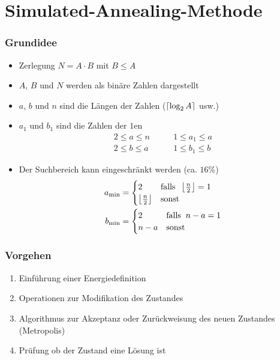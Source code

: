 \section{Simulated-Annealing-Methode}

\begin{frame}
  \frametitle{Grundidee}
  \begin{itemize}
    \item Zerlegung $N=A\cdot B$ mit $B \leq A$
    \pause{}
    \item $A$, $B$ und $N$ werden als binäre Zahlen dargestellt
    \pause{}
    \item $a$, $b$ und $n$ sind die Längen der Zahlen ($\left\lceil\log_2 A\right\rceil$ usw.)
    \pause{}
    \item $a_1$ und $b_1$ sind die Zahlen der $1$en
      \begin{align*}
        2 \leq a \leq n \quad&\quad 1 \leq a_1 \leq a \\
        2 \leq b \leq a \quad&\quad	1 \leq b_1 \leq b
      \end{align*}
    \pause{}
    \item Der Suchbereich kann eingeschränkt werden (ca. $16\%$)
      \begin{align*}
        a_{\min}&=\begin{cases} 2 & \mathrm{falls}\;\; \left\lfloor\frac{n}{2}\right\rfloor=1 \\ \left\lfloor\frac{n}{2}\right\rfloor & \mathrm{sonst} \end{cases} \\
        b_{\min}&=\begin{cases} 2 & \mathrm{falls}\;\; n-a=1 \\ n-a & \mathrm{sonst} \end{cases}
      \end{align*}
  \end{itemize}
\end{frame}

\begin{frame}
  \frametitle{Vorgehen}
  \begin{enumerate}
    \item Einführung einer Energiedefinition
    \pause{}
    \item Operationen zur Modifikation des Zustandes
    \pause{}
    \item Algorithmus zur Akzeptanz oder Zurückweisung des neuen Zustandes (Metropolis)
    \pause{}
    \item Prüfung ob der Zustand eine Lösung ist
  \end{enumerate}
\end{frame}

